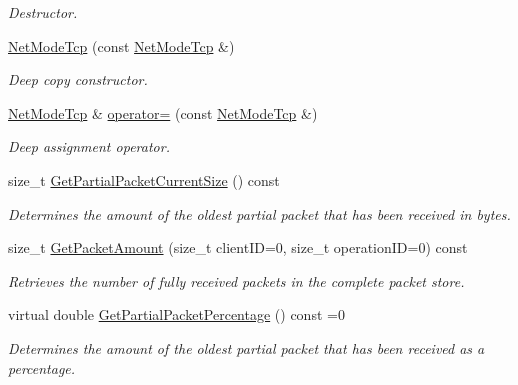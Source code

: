 \begin{DoxyCompactItemize}
\begin{DoxyCompactList}\small\item\em Destructor. \item\end{DoxyCompactList}\item 
\hyperlink{class_net_mode_tcp_ad39bd323595bbc60759563b698ee854f}{NetModeTcp} (const \hyperlink{class_net_mode_tcp}{NetModeTcp} \&)
\begin{DoxyCompactList}\small\item\em Deep copy constructor. \item\end{DoxyCompactList}\item 
\hyperlink{class_net_mode_tcp}{NetModeTcp} \& \hyperlink{class_net_mode_tcp_ab8848d01d2e4d670f8535556f10cd01c}{operator=} (const \hyperlink{class_net_mode_tcp}{NetModeTcp} \&)
\begin{DoxyCompactList}\small\item\em Deep assignment operator. \item\end{DoxyCompactList}\item 
size\_\-t \hyperlink{class_net_mode_tcp_a67100f9412a69ea4059e77c04edd2251}{GetPartialPacketCurrentSize} () const 
\begin{DoxyCompactList}\small\item\em Determines the amount of the oldest partial packet that has been received in bytes. \item\end{DoxyCompactList}\item 
size\_\-t \hyperlink{class_net_mode_tcp_ac2aaad8fa89939a1204e5f0a5ef9522f}{GetPacketAmount} (size\_\-t clientID=0, size\_\-t operationID=0) const 
\begin{DoxyCompactList}\small\item\em Retrieves the number of fully received packets in the complete packet store. \item\end{DoxyCompactList}\item 
virtual double \hyperlink{class_net_mode_tcp_a837a9e13611bf2158aa07df5b21d55d0}{GetPartialPacketPercentage} () const =0
\begin{DoxyCompactList}\small\item\em Determines the amount of the oldest partial packet that has been received as a percentage. \item\end{DoxyCompactList}\item 

\end{DoxyCompactItemize}
